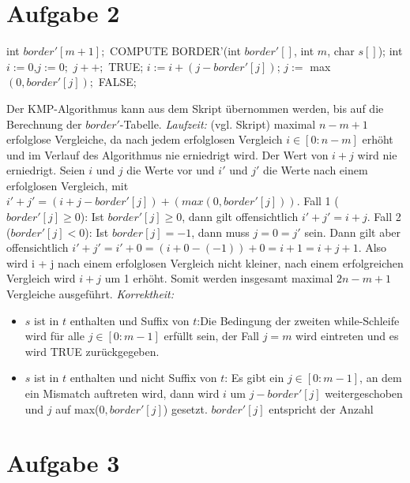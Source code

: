 \documentclass[a4paper,10pt,oneside,leqno]{scrartcl}
\begin{document}
\section*{Aufgabe 2}
\begin{algorithmic}
\State int $border'[m+1];$
\State COMPUTE BORDER'(int $border'[]$, int $m$, char $s[]$);
\State int $i := 0$,$j:=0;$
    \State $j++;$
     \State \Return TRUE;\EndIf
  \EndWhile
  \State $i := i + (j-border'[j])$;
  \State $j :=$ max$(0, border'[j]);$
\EndWhile
\State \Return FALSE;
\EndFunction
\end{algorithmic}
Der KMP-Algorithmus kann aus dem Skript übernommen werden, bis auf die Berechnung der $border'$-Tabelle.\newline
\textit{Laufzeit:} (vgl. Skript) maximal $n-m+1$ erfolglose Vergleiche, da nach jedem erfolglosen Vergleich $i\in [0 : n- m]$ erhöht und
im Verlauf des Algorithmus nie erniedrigt wird. Der Wert von $i+j$ wird nie erniedrigt. Seien $i$ und $j$ die Werte vor und $i'$ und $j'$
die Werte nach einem erfolglosen Vergleich, mit $i' + j' = (i + j- border'[j]) + (max(0, border'[j]))$.\newline
Fall 1 ($border'[j] \geq 0$): Ist $border'[j] \geq 0$, dann gilt offensichtlich $i'+j' = i + j$.\newline
Fall 2 ($border'[j] < 0$): Ist $border[j] = -1$, dann muss $j = 0 = j'$ sein. Dann gilt
aber offensichtlich $i'+j' = i' + 0 = (i + 0 -(-1)) + 0 = i + 1 = i + j + 1$.\newline
Also wird i + j nach einem erfolglosen Vergleich nicht kleiner, nach einem erfolgreichen Vergleich wird $i + j$ um 1 erhöht.
Somit werden insgesamt maximal $2n- m + 1$ Vergleiche ausgeführt.\newline
\textit{Korrektheit:}
\begin{itemize}
  \item $s$ ist in $t$ enthalten und Suffix von $t$:\newline Die Bedingung der zweiten while-Schleife wird für alle $j\in [0:m-1]$ erfüllt sein,
  der Fall $j=m$ wird eintreten und es wird TRUE zurückgegeben.
  \item $s$ ist in $t$ enthalten und nicht Suffix von $t$: Es gibt ein $j\in [0:m-1]$, an dem ein Mismatch auftreten wird, dann wird $i$ um
  $j-border'[j]$ weitergeschoben und $j$ auf max($0,border'[j]$) gesetzt. $border'[j]$ entspricht der Anzahl
\end{itemize}

\section*{Aufgabe 3}
\end{document}
